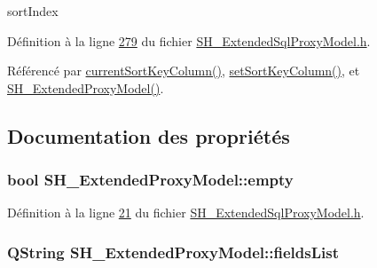 sort\-Index 



Définition à la ligne \hyperlink{SH__ExtendedSqlProxyModel_8h_source_l00279}{279} du fichier \hyperlink{SH__ExtendedSqlProxyModel_8h_source}{S\-H\-\_\-\-Extended\-Sql\-Proxy\-Model.\-h}.



Référencé par \hyperlink{classSH__ExtendedProxyModel_a76786ad4b81dbd521a610c2f6f973a96}{current\-Sort\-Key\-Column()}, \hyperlink{classSH__ExtendedProxyModel_ad1eb97a28d23e9aba8174bd5ffd7a5e4}{set\-Sort\-Key\-Column()}, et \hyperlink{classSH__ExtendedProxyModel_a63b0969a9f5799c9e871e6ceb13cf83e}{S\-H\-\_\-\-Extended\-Proxy\-Model()}.



\subsection{Documentation des propriétés}
\hypertarget{classSH__ExtendedProxyModel_a9e22d17af7776aca8052084cc33c3442}{
\subsubsection[{empty}]{\setlength{\rightskip}{0pt plus 5cm}bool S\-H\-\_\-\-Extended\-Proxy\-Model\-::empty\hspace{0.3cm}{\ttfamily [read]}}}\label{classSH__ExtendedProxyModel_a9e22d17af7776aca8052084cc33c3442}


Définition à la ligne \hyperlink{SH__ExtendedSqlProxyModel_8h_source_l00021}{21} du fichier \hyperlink{SH__ExtendedSqlProxyModel_8h_source}{S\-H\-\_\-\-Extended\-Sql\-Proxy\-Model.\-h}.

\hypertarget{classSH__ExtendedProxyModel_a15e779ba92384a57442d6bd79ef3d1d1}{
\subsubsection[{fields\-List}]{\setlength{\rightskip}{0pt plus 5cm}Q\-String S\-H\-\_\-\-Extended\-Proxy\-Model\-::fields\-List\hspace{0.3cm}{\ttfamily [read]}}}\label{classSH__ExtendedProxyModel_a15e779ba92384a57442d6bd79ef3d1d1}


